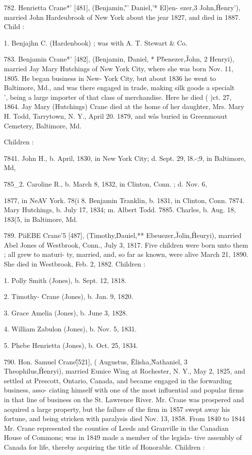 782. Henrietta Crane*' [481], (Benjamin,\^'' Daniel,'* El)en- 
ezer,3 John,\^ Henry'), married John Hardeubrook of New York 
about the jear 1827, and died in 1887. Child : 

1. Benjajhn C. (Hardenbook) ; was with A. T. Stewart \& Co. 

783. Benjamin Crane*' [482], (Benjamin, \^ Daniel, * P\^benezer,\^ 
John, 2 Henryi), married Jay Mary Hutchings of New York City, 
where she was born Nov. 11, 1805. He began business in New- 
York City, but about 1836 he went to Baltimore, Md., and was 
there engaged in trade, making silk goods a specialt\\', being a 
large importer of that class of merchandise. Here he died ( )ct. 
27, 1864. Jay Mary (Hutchings) Crane died at the home of 
her daughter, Mrs. Mary H. Todd, Tarrytown, N. Y., April 20. 
1879, and w\^as buried in Greenmouut Cemetery, Baltimore, Md. 

Children : 

7841. John H., b. April, 1830, in New York City; d. Sept. 29, l8.-;9, 
in Baltimore, Md, 




785\_2. Caroline R., b. March 8, 1832, in Clinton, Conn. ; d. Nov. 6, 

1877, in NeAV York. 
78(i 8. Benjamin Tranklin, b. 1831, in Clinton, Conn. 
7874. Mary Hutchings, b. July 17, 1834; m. Albert Todd. 
7885. Charles, b. Aug. 18, 183(5, in Baltimore, Md. 

789. PiiEBE Crane'5 [487], (Timothy,\^ Dauiel,** Ebeuezer,\^ 
Jolin,\^ Heuryi), married Abel Jones of Westbrook, Conn., July 
3, 1817. Five children were born unto them ; all grew to maturi- 
ty, married, and, so far as known, were alive March 21, 1890. 
She died in Westbrook, Feb. 2, 1882. Children : 

1. Polly Smith (Jones), b. Sept. 12, 1818. 

2. Timothy- Crane (Jones), b. Jan. 9, 1820. 

3. Grace Amelia (Jones), b. June 3, 1828. 

4. William Zabulon (Jones), b. Nov. 5, 1831. 

5. Phebe Henrietta (Jones), b. Oct. 25, 1834. 

790. Hon. Samuel Crane\^ [521], ( Augustus, \^ Elisha,\^ 
Nathaniel, 3 Theophilus,\^ Henryi), married Eunice Wing at 
Rochester, N. Y., May 2, 1825, and settled at Prescott, Ontario, 
Canada, and became engaged in the forwarding business, asso- 
ciating himself with one of the most influential and popular firms 
in that line of business on the St. Lawrence River. Mr. Crane 
was prospered and acquired a large property, but the failure of 
the firm in 1857 swept away his fortune, and being stricken with 
paralysis died Nov. 13, 1858. From 1840 to 1844 Mr. Crane 
represented the counties of Leeds and Granville in the Canadian 
House of Commons; was in 1849 made a member of the legisla- 
tive assembly of Canada for life, thereby acquiring the title of 
Honorable. Children : 

